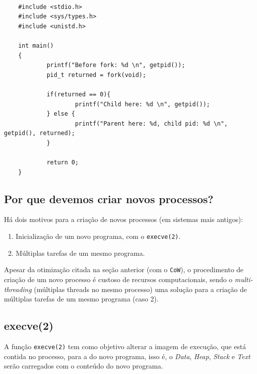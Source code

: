 \begin{verbatim}

    #include <stdio.h>
    #include <sys/types.h>
    #include <unistd.h>
    
    int main()
    {
            printf("Before fork: %d \n", getpid());
            pid_t returned = fork(void);
            
            if(returned == 0){
                    printf("Child here: %d \n", getpid());
            } else {
                    printf("Parent here: %d, child pid: %d \n", getpid(), returned);
            }
            
            return 0;
    }

\end{verbatim}



\hypertarget{por-que-devemos-criar-novos-processos}{%
\subsection{Por que devemos criar novos processos?}\label{por-que-devemos-criar-novos-processos}}

Há dois motivos para a criação de novos processos (em sistemas mais
antigos):

\begin{enumerate}
\def\labelenumi{\arabic{enumi}.}
\tightlist
\item
  Inicialização de um novo programa, com o \texttt{execve(2)}.
\item
  Múltiplas tarefas de um mesmo programa.
\end{enumerate}

Apesar da otimização citada na seção anterior (com o \texttt{CoW}), o
procedimento de criação de um novo processo é custoso de recursos
computacionais, sendo o \emph{multi-threading} (múltiplas threads no
mesmo processo) uma solução para a criação de múltiplas tarefas de um
mesmo programa (caso 2).

\hypertarget{execve2}{%
\subsection{execve(2)}\label{execve2}}

A função \texttt{execve(2)} tem como objetivo alterar a imagem de
execução, que está contida no processo, para a do novo programa, isso é,
o \emph{Data}, \emph{Heap}, \emph{Stack} e \emph{Text} serão carregados
com o conteúdo do novo programa.

